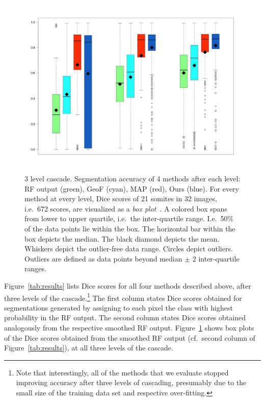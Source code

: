 \documentclass[10pt,twocolumn,letterpaper]{article}
\begin{document}
\begin{figure}[tb]
\centering
\small
\begin{center}
\includegraphics[width=\columnwidth]{Cascade.jpeg} %
\end{center}
\label{fig:boxplots}
\caption{3 level cascade. Segmentation accuracy of 4 methods after each level: RF output (green), GeoF (cyan), MAP (red), Ours (blue). For every method at every level, Dice scores of 21 somites in 32 images, i.e.\ 672 scores, are visualized as a \emph{box plot}~\cite{chambers1983graphical}. A colored box spans from lower to upper quartile, i.e.\ the inter-quartile range. I.e.\ 50\% of the data points lie within the box. The horizontal bar within the box depicts the median. The black diamond depicts the mean. Whiskers depict the outlier-free data range. Circles depict outliers. Outliers are defined as data points beyond median $\pm$ 2 inter-quartile ranges. }
\end{figure}
%
Figure~\ref{tab:results} lists Dice scores for all four methods described above, after three levels of the cascade.\footnote{Note that interestingly, all of the methods that we evaluate stopped improving accuracy after three levels of cascading, presumably due to the small size of the training data set and respective over-fitting.} The first column states Dice scores obtained for segmentations generated by assigning to each pixel the class with highest probability in the RF output. The second column states Dice scores obtained analogously from the respective smoothed RF output. Figure~\ref{fig:boxplots} shows box plots of the Dice scores obtained from the smoothed RF output (cf.\ second column of Figure~\ref{tab:results}), at all three levels of the cascade. 
\end{document}
